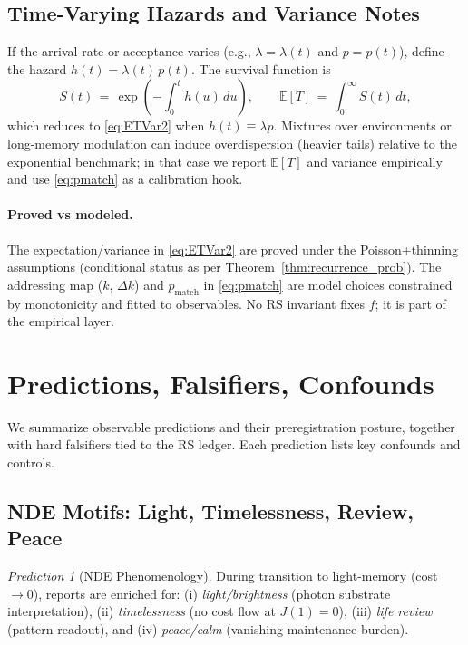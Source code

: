 \documentclass[11pt,letterpaper]{article}
\theoremstyle{definition}
\theoremstyle{remark}
\newtheorem{prediction}[theorem]{Prediction}
\begin{document}
\subsection{Time-Varying Hazards and Variance Notes}

If the arrival rate or acceptance varies (e.g., \(\lambda=\lambda(t)\) and \(p=p(t)\)), define the hazard \(h(t)=\lambda(t)\,p(t)\). The survival function is
\begin{equation}
  S(t) \,=\, \exp\!\left(-\int_{0}^{t} h(u)\,du\right),\qquad \mathbb{E}[T] \,=\, \int_{0}^{\infty} S(t)\,dt, \label{eq:hazard}
\end{equation}
which reduces to \eqref{eq:ETVar2} when \(h(t)\equiv \lambda p\). Mixtures over environments or long-memory modulation can induce overdispersion (heavier tails) relative to the exponential benchmark; in that case we report \(\mathbb{E}[T]\) and variance empirically and use \eqref{eq:pmatch} as a calibration hook.

\paragraph{Proved vs modeled.} The expectation/variance in \eqref{eq:ETVar2} are proved under the Poisson+thinning assumptions (conditional status as per Theorem~\ref{thm:recurrence_prob}). The addressing map (\(k\), \(\Delta k\)) and \(p_{\mathrm{match}}\) in \eqref{eq:pmatch} are model choices constrained by monotonicity and fitted to observables. No RS invariant fixes \(f\); it is part of the empirical layer.

\section{Predictions, Falsifiers, Confounds}

We summarize observable predictions and their preregistration posture, together with hard falsifiers tied to the RS ledger. Each prediction lists key confounds and controls.

\subsection{NDE Motifs: Light, Timelessness, Review, Peace}

\begin{prediction}[NDE Phenomenology]
During transition to light-memory (cost \(\to 0\)), reports are enriched for: (i) \emph{light/brightness} (photon substrate interpretation), (ii) \emph{timelessness} (no cost flow at \(J(1)=0\)), (iii) \emph{life review} (pattern readout), and (iv) \emph{peace/calm} (vanishing maintenance burden).
\end{prediction}
\end{document}
